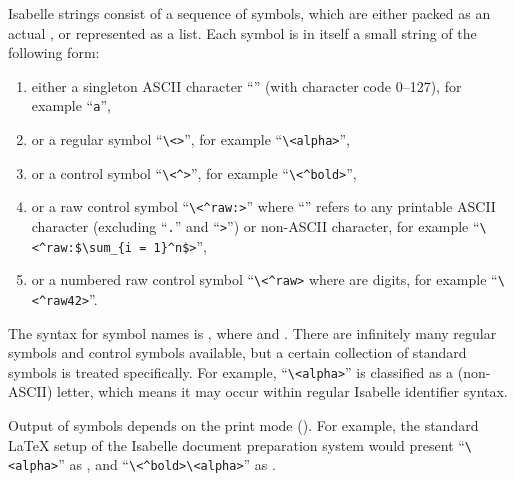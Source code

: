 \begin{isabellebody}
\begin{isamarkuptext}
  Isabelle strings consist of a sequence of
  symbols, which are either packed as
  an actual , or represented as a list.  Each symbol
  is in itself a small string of the following form:

  \begin{enumerate}

  \item either a singleton ASCII character ``'' (with
  character code 0--127), for example ``\verb,a,'',

  \item or a regular symbol ``\verb,\,\verb,<,\verb,>,'', for example ``\verb,\,\verb,<alpha>,'',

  \item or a control symbol ``\verb,\,\verb,<^,\verb,>,'', for example ``\verb,\,\verb,<^bold>,'',

  \item or a raw control symbol ``\verb,\,\verb,<^raw:,\isa{{\isasymdots}}\verb,>,'' where ``\isa{{\isasymdots}}'' refers to any printable ASCII
  character (excluding ``\verb,.,'' and ``\verb,>,'') or non-ASCII
  character, for example ``\verb,\,\verb,<^raw:$\sum_{i = 1}^n$>,'',

  \item or a numbered raw control symbol ``\verb,\,\verb,<^raw,\verb,>, where  are digits, for example
  ``\verb,\,\verb,<^raw42>,''.

  \end{enumerate}

  The  syntax for symbol names is , where  and
  .  There are infinitely many regular symbols
  and control symbols available, but a certain collection of standard
  symbols is treated specifically.  For example,
  ``\verb,\,\verb,<alpha>,'' is classified as a (non-ASCII) letter,
  which means it may occur within regular Isabelle identifier syntax.

  Output of symbols depends on the print mode
  ().  For example, the standard {\LaTeX} setup
  of the Isabelle document preparation system would present
  ``\verb,\,\verb,<alpha>,'' as \isa{{\isasymalpha}}, and
  ``\verb,\,\verb,<^bold>,\verb,\,\verb,<alpha>,'' as \isa{\isactrlbold {\isasymalpha}}.


\end{isamarkuptext}
\end{isabellebody}
